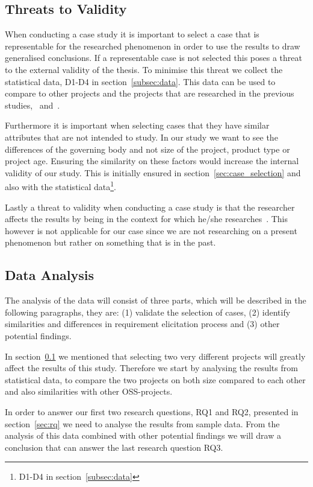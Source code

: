 \documentclass[a4paper,11pt]{article}
\begin{document}
{\subsection{Threats to Validity}
\label{sec:vthreats}
When conducting a case study it is important to select a case that is representable for the researched phenomenon in order to use the results to draw generalised conclusions. If a representable case is not selected this poses a threat to the external validity of the thesis. To minimise this threat we collect the statistical data, D1-D4 in section~\ref{subsec:data}. This data can be used to compare to other projects and the projects that are researched in the previous studies,~\cite{Mockus2002a} and~\cite{Noll}.

Furthermore it is important when selecting cases that they have similar attributes that are not intended to study. In our study we want to see the differences of the governing body and not size of the project, product type or project age. Ensuring the similarity on these factors would increase the internal validity of our study. This is initially ensured in section~\ref{sec:case_selection} and also with the statistical data\footnote{D1-D4 in section~\ref{subsec:data}}.

Lastly a threat to validity when conducting a case study is that the researcher affects the results by being in the context for which he/she researches~\cite{Oates2005}. This however is not applicable for our case since we are not researching on a present phenomenon but rather on something that is in the past.

\subsection{Data Analysis}
The analysis of the data will consist of three parts, which will be described in the following paragraphs, they are: (1) validate the selection of cases, (2) identify similarities and differences in requirement elicitation process and (3) other potential findings.

In section~\ref{sec:vthreats} we mentioned that selecting two very different projects will greatly affect the results of this study. Therefore we start by analysing the results from statistical data, to compare the two projects on both size compared to each other and also similarities with other OSS-projects.

In order to answer our first two research questions, RQ1 and RQ2, presented in section~\ref{sec:rq} we need to analyse the results from sample data. From the analysis of this data combined with other potential findings we will draw a conclusion that can answer the last research question RQ3.

}
\end{document}
